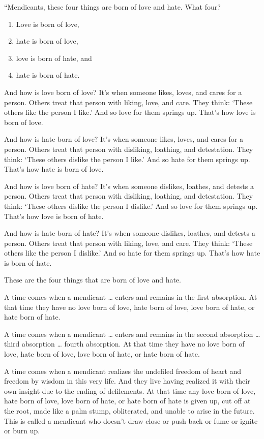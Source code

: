 \documentclass[12pt,openany]{book}%
\begin{document}
“Mendicants, these four things are born of love and hate. What four? 

\begin{enumerate}%
\item Love is born of love, %
\item hate is born of love, %
\item love is born of hate, and %
\item hate is born of hate. %
\end{enumerate}

And how is love born of love? It’s when someone likes, loves, and cares for a person. Others treat that person with liking, love, and care. They think: ‘These others like the person I like.’ And so love for them springs up. That’s how love is born of love. 

And how is hate born of love? It’s when someone likes, loves, and cares for a person. Others treat that person with disliking, loathing, and detestation. They think: ‘These others dislike the person I like.’ And so hate for them springs up. That’s how hate is born of love. 

And how is love born of hate? It’s when someone dislikes, loathes, and detests a person. Others treat that person with disliking, loathing, and detestation. They think: ‘These others dislike the person I dislike.’ And so love for them springs up. That’s how love is born of hate. 

And how is hate born of hate? It’s when someone dislikes, loathes, and detests a person. Others treat that person with liking, love, and care. They think: ‘These others like the person I dislike.’ And so hate for them springs up. That’s how hate is born of hate. 

These are the four things that are born of love and hate. 

A time comes when a mendicant … enters and remains in the first absorption. At that time they have no love born of love, hate born of love, love born of hate, or hate born of hate. 

A time comes when a mendicant … enters and remains in the second absorption … third absorption … fourth absorption. At that time they have no love born of love, hate born of love, love born of hate, or hate born of hate. 

A time comes when a mendicant realizes the undefiled freedom of heart and freedom by wisdom in this very life. And they live having realized it with their own insight due to the ending of defilements. At that time any love born of love, hate born of love, love born of hate, or hate born of hate is given up, cut off at the root, made like a palm stump, obliterated, and unable to arise in the future. This is called a mendicant who doesn’t draw close or push back or fume or ignite or burn up. 
\end{document}
